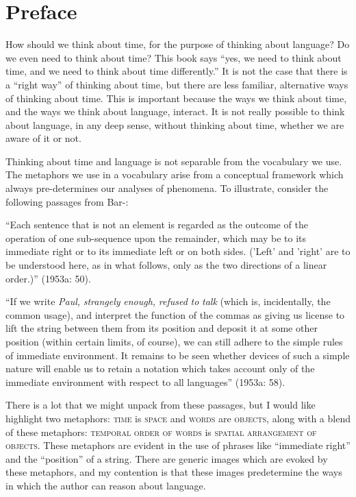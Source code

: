 
\chapter{Preface}

How should we think about time, for the purpose of thinking about language? Do we even need to think about time? This book says “yes, we need to think about time, and we need to think about time differently.” It is not the case that there is a “right way” of thinking about time, but there are less familiar, alternative ways of thinking about time. This is important because the ways we think about time, and the ways we think about language, interact. It is not really possible to think about language, in any deep sense, without thinking about time, whether we are aware of it or not. 

  Thinking about time and language is not separable from the vocabulary we use. The metaphors we use in a vocabulary arise from a conceptual framework which always pre-determines our analyses of phenomena. To illustrate, consider the following passages from Bar-\citet{Hillel1953a}:

“Each sentence that is not an element is regarded as the outcome of the operation of one sub-sequence upon the remainder, which may be to its immediate right or to its immediate left or on both sides. ('Left' and 'right' are to be understood here, as in what follows, only as the two directions of a linear order.)” (1953a: 50).

“If we write \textit{Paul,} \textit{strangely} \textit{enough,} \textit{refused} \textit{to} \textit{talk} (which is, incidentally, the common usage), and interpret the function of the commas as giving us license to lift the string between them from its position and deposit it at some other position (within certain limits, of course), we can still adhere to the simple rules of immediate environment. It remains to be seen whether devices of such a simple nature will enable us to retain a notation which takes account only of the immediate environment with respect to all languages” (1953a: 58).

There is a lot that we might unpack from these passages, but I would like highlight two metaphors: \textsc{time} is \textsc{space} and \textsc{words} are \textsc{objects}, along with a blend of these metaphors: \textsc{temporal} \textsc{order} \textsc{of} \textsc{words} is \textsc{spatial} \textsc{arrangement} \textsc{of} \textsc{objects}. These metaphors are evident in the use of phrases like “immediate right” and the “position” of a string. There are generic images which are evoked by these metaphors, and my contention is that these images predetermine the ways in which the author can reason about language. 

